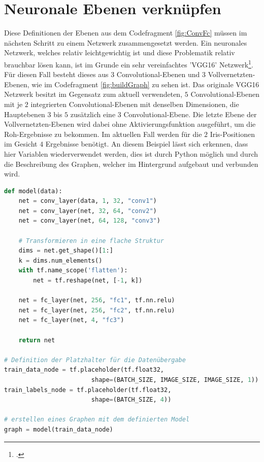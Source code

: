 \section{Neuronale Ebenen verknüpfen}

Diese Definitionen der Ebenen aus dem Codefragment \ref{fig:ConvFc} müssen im nächsten Schritt zu einem Netzwerk zusammengesetzt werden. 
Ein neuronales Netzwerk, welches relativ leichtgewichtig ist und diese Problematik relativ brauchbar lösen kann, ist im Grunde ein sehr vereinfachtes 'VGG16' Netzwerk\footcite{VGG16: https://arxiv.org/pdf/1409.1556.pdf}. 
Für diesen Fall besteht dieses aus $3$ Convolutional-Ebenen und $3$ Vollvernetzten-Ebenen, wie im Codefragment \ref{fig:buildGraph} zu sehen ist. 
Das originale VGG16 Netzwerk besitzt im Gegensatz zum aktuell verwendeten, $5$ Convolutional-Ebenen mit je $2$ integrierten Convolutional-Ebenen mit denselben Dimensionen, die Hauptebenen $3$ bis $5$ zusätzlich eine $3$ Convolutional-Ebene. 
Die letzte Ebene der Vollvernetzten-Ebenen wird dabei ohne Aktivierungsfunktion ausgeführt, um die Roh-Ergebnisse zu bekommen. 
Im aktuellen Fall werden für die $2$ Iris-Positionen im Gesicht $4$ Ergebnisse benötigt. 
An diesem Beispiel lässt sich erkennen, dass hier Variablen wiederverwendet werden, dies ist durch Python möglich und durch die Beschreibung des Graphen, welcher im Hintergrund aufgebaut und verbunden wird. 
\begin{lstlisting}[caption={Modelldefinition des Graphen},label=fig:buildGraph,captionpos=b,language=Python]
def model(data):
    net = conv_layer(data, 1, 32, "conv1")
    net = conv_layer(net, 32, 64, "conv2")
    net = conv_layer(net, 64, 128, "conv3")

    # Transformieren in eine flache Struktur
    dims = net.get_shape()[1:]
    k = dims.num_elements()
    with tf.name_scope('flatten'):
        net = tf.reshape(net, [-1, k])
    
    net = fc_layer(net, 256, "fc1", tf.nn.relu)    
    net = fc_layer(net, 256, "fc2", tf.nn.relu)
    net = fc_layer(net, 4, "fc3")
    
    return net
    
# Definition der Platzhalter für die Datenübergabe
train_data_node = tf.placeholder(tf.float32, 
						shape=(BATCH_SIZE, IMAGE_SIZE, IMAGE_SIZE, 1))
train_labels_node = tf.placeholder(tf.float32, 
						shape=(BATCH_SIZE, 4))

# erstellen eines Graphen mit dem definierten Model
graph = model(train_data_node)
\end{lstlisting}

